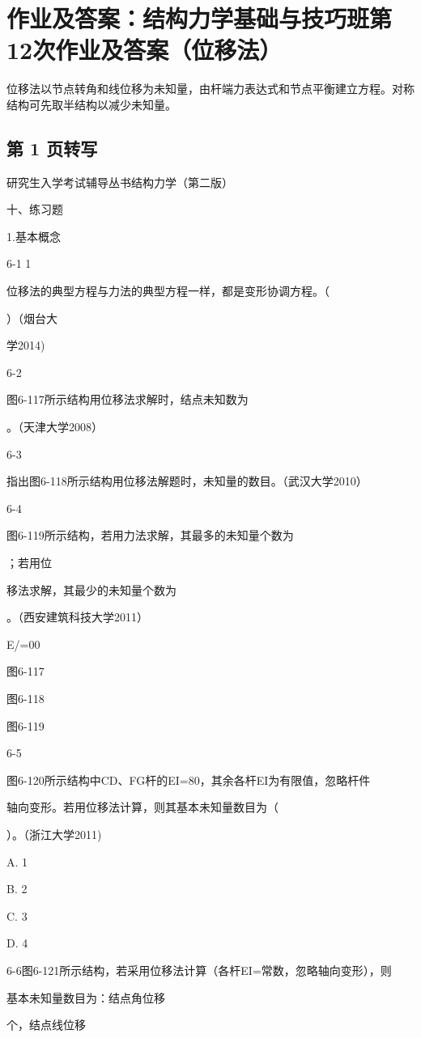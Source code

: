 \section{作业及答案：结构力学基础与技巧班第12次作业及答案（位移法）}
\begin{analysisbox}
位移法以节点转角和线位移为未知量，由杆端力表达式和节点平衡建立方程。对称结构可先取半结构以减少未知量。
\end{analysisbox}
\subsection*{第 1 页转写}
研究生入学考试辅导丛书结构力学（第二版）

十、练习题

1.基本概念

6-1 1

位移法的典型方程与力法的典型方程一样，都是变形协调方程。（

）（烟台大

学2014)

6-2

图6-117所示结构用位移法求解时，结点未知数为

。（天津大学2008）

6-3

指出图6-118所示结构用位移法解题时，未知量的数目。（武汉大学2010）

6-4

图6-119所示结构，若用力法求解，其最多的未知量个数为

；若用位

移法求解，其最少的未知量个数为

。（西安建筑科技大学2011）

E/=00

图6-117

图6-118

图6-119

6-5

图6-120所示结构中CD、FG杆的EI=80，其余各杆EI为有限值，忽略杆件

轴向变形。若用位移法计算，则其基本未知量数目为（

）。（浙江大学2011)

A. 1

B. 2

C. 3

D. 4

6-6图6-121所示结构，若采用位移法计算（各杆EI=常数，忽略轴向变形），则

基本未知量数目为：结点角位移

个，结点线位移

